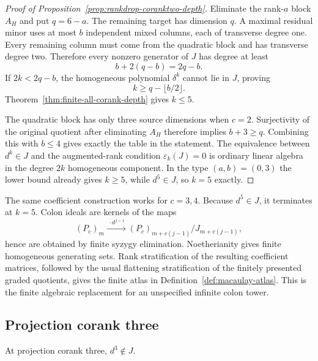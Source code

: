 \begin{proof}[Proof of Proposition~\ref{prop:rankdrop-coranktwo-depth}]
Eliminate the rank-\(a\) block \(A_H\) and put \(q=6-a\).
The remaining target has dimension \(q\).  A maximal residual minor
uses at most \(b\) independent mixed columns, each of transverse
degree one.  Every remaining column must come from the quadratic
block and has transverse degree two.  Therefore every nonzero
generator of \(J\) has degree at least
\[
 b+2(q-b)=2q-b.
\]
If \(2k<2q-b\), the homogeneous polynomial \(\delta^k\) cannot lie in
\(J\), proving
\[
 k\ge q-\lfloor b/2\rfloor.
\]
Theorem~\ref{thm:finite-all-corank-depth} gives \(k\le5\).

The quadratic block has only three source dimensions when \(c=2\).
Surjectivity of the original quotient after eliminating \(A_H\)
therefore implies \(b+3\ge q\).  Combining this with \(b\le4\) gives
exactly the table in the statement.  The equivalence between
\(d^k\in J\) and the augmented-rank condition
\(\varepsilon_k(J)=0\) is ordinary linear algebra in the degree
\(2k\) homogeneous component.  In the type \((a,b)=(0,3)\) the lower
bound already gives \(k\ge5\), while \(d^5\in J\), so \(k=5\)
exactly.
\end{proof}

The same coefficient construction works for \(c=3,4\).  Because
\(d^5\in J\), it terminates at \(k=5\).  Colon ideals are kernels of
the maps
\[
 (P_c)_m\xrightarrow{\ \cdot d^{j-1}\ }
 (P_c)_{m+c(j-1)}/J_{m+c(j-1)},
\]
hence are obtained by finite syzygy elimination.  Noetherianity gives
finite homogeneous generating sets.  Rank stratification of the
resulting coefficient matrices, followed by the usual flattening
stratification of the finitely presented graded quotients, gives the
finite atlas in Definition~\ref{def:macaulay-atlas}.  This is the
finite algebraic replacement for an unspecified infinite colon tower.

\subsection{Projection corank three}

\begin{lemma}
\label{lem:no-d3-corank3}
At projection corank three, \(d^3\notin J\).
\end{lemma}


